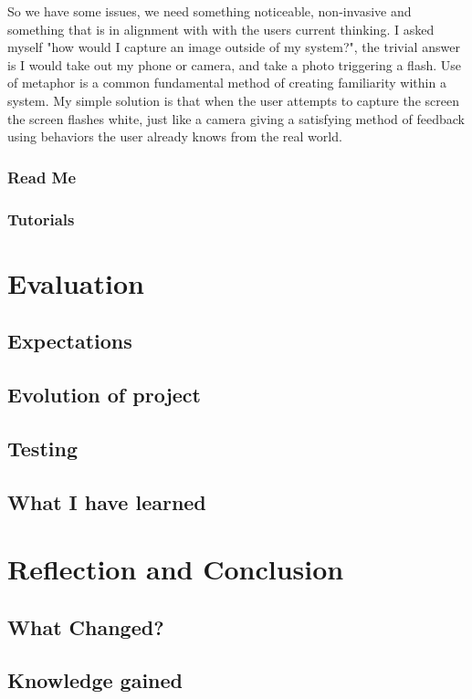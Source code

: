 \documentclass[a4paper]{report}
\begin{document}
So we have some issues, we need something noticeable, non-invasive and something that is in alignment with with the users current thinking. I asked myself "how would I capture an image outside of my system?", the trivial answer is I would take out my phone or camera, and take a photo triggering a flash. Use of metaphor is a common fundamental method of creating familiarity within a system. My simple solution is that when the user attempts to capture the screen the screen flashes white, just like a camera giving a satisfying method of feedback using behaviors the user already knows from the real world. 

\subsection{Read Me}
\subsection{Tutorials}

\chapter{Evaluation}
\section{Expectations}
\section{Evolution of project}
\section{Testing}
\section{What I have learned}

\chapter{Reflection and Conclusion}
\section{What Changed?}
\section{Knowledge gained}



\end{document}
